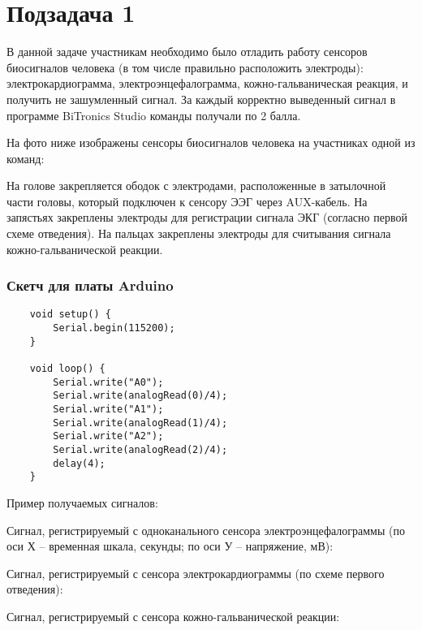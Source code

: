 \solutionSection

\section*{Подзадача 1}

В данной задаче участникам необходимо было отладить работу сенсоров биосигналов человека (в том числе правильно расположить электроды): электрокардиограмма, электроэнцефалограмма, кожно-гальваническая реакция, и получить не зашумленный сигнал. За каждый корректно выведенный сигнал в программе BiTronics Studio команды получали по 2 балла.

На фото ниже изображены сенсоры биосигналов человека на участниках одной из команд:


На голове закрепляется ободок с электродами, расположенные в затылочной части головы, который подключен к сенсору ЭЭГ через AUX-кабель. На запястьях закреплены электроды для регистрации сигнала ЭКГ (согласно первой схеме отведения). На пальцах закреплены электроды для считывания сигнала кожно-гальванической реакции.

\subsubsection*{Скетч для платы Arduino}

\begin{verbatim}
    void setup() {
        Serial.begin(115200);
    }

    void loop() {
        Serial.write("A0");
        Serial.write(analogRead(0)/4);
        Serial.write("A1");
        Serial.write(analogRead(1)/4);
        Serial.write("A2");
        Serial.write(analogRead(2)/4);
        delay(4);
    }
\end{verbatim}

Пример получаемых сигналов:

Сигнал, регистрируемый с одноканального сенсора электроэнцефалограммы (по оси Х – временная шкала, секунды; по оси У – напряжение, мВ):


Сигнал, регистрируемый с сенсора электрокардиограммы (по схеме первого отведения):


Сигнал, регистрируемый с сенсора кожно-гальванической реакции:


